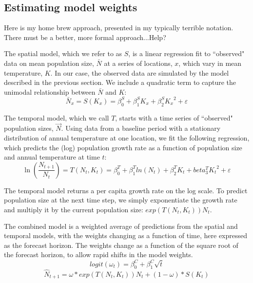 \documentclass[11pt]{article}
\begin{document}
\subsection{Estimating model weights}

Here is my home brew approach, presented in my typically terrible notation. There must be a better, more formal approach...Help?

The spatial model, which we refer to as $S$, is a linear regression fit to ``observed" data on mean population size, $\bar{N}$ at a series of locations, $x$, which vary in mean temperature, $K$. In our case, the observed data are simulated by the model described in the previous section. We include a quadratic term to capture the unimodal relationship between  $\bar{N}$ and $K$:
 \begin{equation}
 \bar{N}_x = S(K_x) = \beta^S_0 +  \beta^S_1 K_x +\beta^S_2 {K_x}^2 + \varepsilon
 \label{eqn:spatial_regression}
 \end{equation}

The temporal model, which we call $T$, starts with a time series of ``observed" population sizes, $\vec{N}$. Using data from a baseline period with a stationary distribution of annual temperature at one location, we fit the following regression, which predicts the (log) population growth rate as a function of population size and annual temperature at time $t$:
 \begin{equation}
 \ln(\frac{N_{t+1}}{N_t}) = T(N_t,K_t) = \beta^T_0 +  \beta^T_1 ln(N_t) +\beta^T_2 K_t + beta^T_3 {K_t}^2 +  \varepsilon
 \label{eqn:temporal_regression}
 \end{equation}
 
The temporal model returns a per capita growth rate on the log scale. To predict population size at the next time step, we simply exponentiate the growth rate and multiply it by the current population size: $exp(T(N_t,K_t)) N_t$.

The combined model is a weighted average of predictions from the spatial and temporal models, with the weights changing as a function of time, here expressed as the forecast horizon. The weights change as a function of the square root of the forecast horizon, to allow rapid shifts in the model weights. 
\begin{equation}
logit(\omega_t)=\beta^C_0 + \beta^C_1 \sqrt{t}
\label{eqn:weights}
\end{equation}
\begin{equation}
\hat{N}_{t+1} = \omega * exp(T(N_{t},K_t)) N_t + (1-\omega) * S(K_t) 
\label{eqn:combined_model}
\end{equation}
\end{document}
